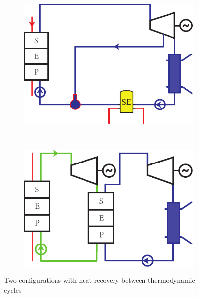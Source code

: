 \begin{figure}[htbp]
\centering
	\begin{subfigure}[b]{0.4\columnwidth}
	\includegraphics[width = \columnwidth]{fig/Stirling-Rankine}
	\caption{}\label{fig:Stirling-Rankine}
	\end{subfigure}
	~
\begin{subfigure}[b]{0.4\columnwidth}
	\includegraphics[width = \columnwidth]{fig/SeriesRankine}
	\caption{}\label{fig:Rankine-Rankine}
	\end{subfigure}
	\caption{Two configurations with heat recovery between thermodynamic cycles}
	\label{fig:coupledCycles}
\end{figure}


